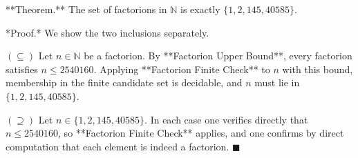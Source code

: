 **Theorem.** The set of factorions in $\mathbb{N}$ is exactly $\{1, 2, 145, 40585\}$.

*Proof.* We show the two inclusions separately.

$(\subseteq)$ Let $n \in \mathbb{N}$ be a factorion. By **Factorion Upper Bound**, every factorion satisfies $n \leq 2540160$. Applying **Factorion Finite Check** to $n$ with this bound, membership in the finite candidate set is decidable, and $n$ must lie in $\{1, 2, 145, 40585\}$.

$(\supseteq)$ Let $n \in \{1, 2, 145, 40585\}$. In each case one verifies directly that $n \leq 2540160$, so **Factorion Finite Check** applies, and one confirms by direct computation that each element is indeed a factorion. $\blacksquare$